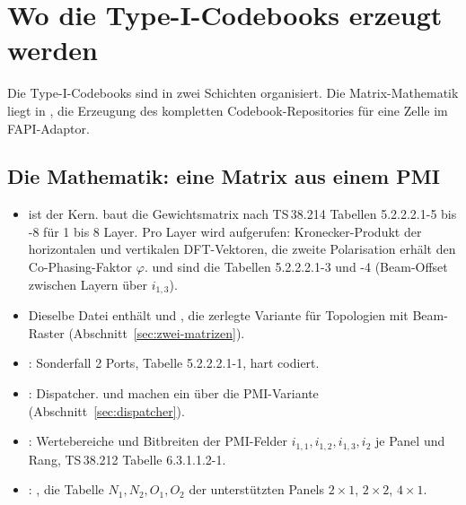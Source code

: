 \section{Wo die Type-I-Codebooks erzeugt werden}

Die Type-I-Codebooks sind in zwei Schichten organisiert. Die Matrix-Mathematik liegt in ,
die Erzeugung des kompletten Codebook-Repositories für eine Zelle im FAPI-Adaptor.

\subsection{Die Mathematik: eine Matrix aus einem PMI}

\begin{itemize}
  \item {} ist der Kern. 
    baut die Gewichtsmatrix nach TS\,38.214 Tabellen 5.2.2.2.1-5 bis -8 für 1 bis 8 Layer. Pro Layer wird
     aufgerufen: Kronecker-Produkt der horizontalen und vertikalen
    DFT-Vektoren, die zweite Polarisation erhält den Co-Phasing-Faktor $\varphi$.
     und  sind die Tabellen
    5.2.2.2.1-3 und -4 (Beam-Offset zwischen Layern über $i_{1,3}$).
  \item Dieselbe Datei enthält  und , die zerlegte
    Variante für Topologien mit Beam-Raster (Abschnitt~\ref{sec:zwei-matrizen}).
  \item {}: Sonderfall 2 Ports, Tabelle 5.2.2.2.1-1,
    hart codiert.
  \item {}: Dispatcher.  und
     machen ein  über die PMI-Variante
    (Abschnitt~\ref{sec:dispatcher}).
  \item {}: Wertebereiche und Bitbreiten der
    PMI-Felder $i_{1,1}, i_{1,2}, i_{1,3}, i_2$ je Panel und Rang, TS\,38.212 Tabelle 6.3.1.1.2-1.
  \item {}: , die
    Tabelle $N_1, N_2, O_1, O_2$ der unterstützten Panels $2\times1$, $2\times2$, $4\times1$.
\end{itemize}


